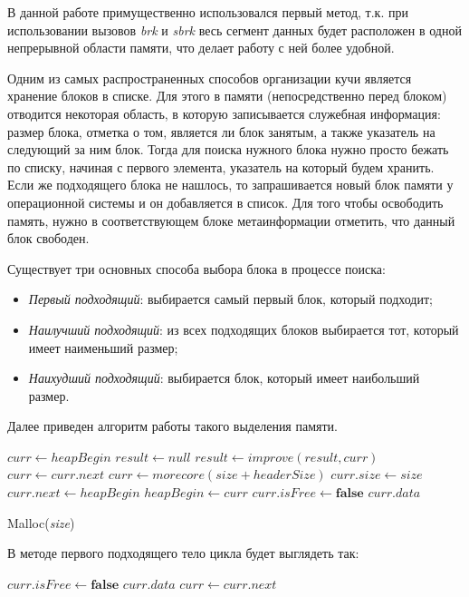 В данной работе примущественно использовался первый метод, т.к. при использовании
вызовов \textit{brk} и \textit{sbrk} весь сегмент данных будет расположен 
в одной непрерывной области памяти, что делает работу с ней более удобной.  

Одним из самых распространенных способов организации кучи
является хранение блоков в списке. Для этого в памяти (непосредственно перед блоком)
отводится некоторая область, в которую записывается служебная информация:
размер блока, отметка о том, является ли блок занятым, а также указатель на 
следующий за ним блок. Тогда для поиска нужного блока нужно просто бежать по 
списку, начиная с первого элемента, указатель на который будем хранить. Если же 
подходящего блока не нашлось, то запрашивается новый блок памяти у операционной системы
и он добавляется в список. Для того чтобы освободить память, нужно в соответствующем
блоке метаинформации отметить, что данный блок свободен.

Существует три основных способа выбора блока в процессе поиска:
\begin{itemize}
\item
	\textit{Первый подходящий}: выбирается самый первый блок, который подходит;
\item
	\textit{Наилучший подходящий}: из всех подходящих блоков выбирается тот, который имеет наименьший размер; 
\item
	\textit {Наихудший подходящий}: выбирается блок, который имеет наибольший размер.
\end{itemize}  

Далее приведен алгоритм работы такого выделения памяти.

\begin{algorithm}[H]
\begin{algorithmic}[1]
\State $curr\gets heapBegin$
\State $result\gets null$
		\State $result\gets improve(result, curr)$				
	\EndIf
	\State $curr\gets curr.next$
\EndWhile
{}
	\State $curr\gets morecore(size + headerSize)$
	\State $curr.size\gets size$
	\State $curr.next\gets heapBegin$ 
	\State $heapBegin\gets curr$
\EndIf
\State $curr.isFree\gets \textbf{false}$
\State \Return $curr.data$
\end{algorithmic}
\caption{Malloc(\textit{size})}

В методе первого подходящего тело цикла будет выглядеть так:
\begin{algorithmic}[1]
	\State $curr.isFree\gets \textbf{false}$
	\State \Return $curr.data$
\EndIf
\State $curr\gets curr.next$
\end{algorithmic}

\end{algorithm}



